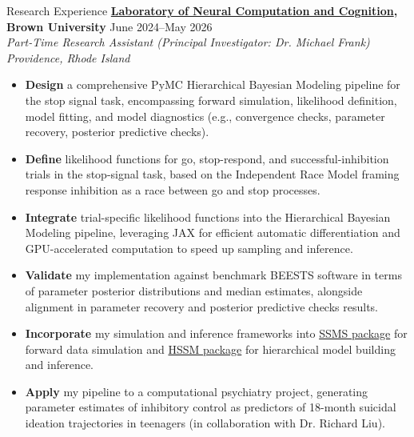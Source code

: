 \documentclass{resume} %
\begin{document}
\begin{rSection}{Research Experience}
\textbf{\href{https://www.lnccbrown.com/}{Laboratory of Neural Computation and Cognition}, Brown University} \hfill{June 2024--May 2026} \\
\textit{Part-Time Research Assistant (Principal Investigator: Dr. Michael Frank)} \hfill{\textit{Providence, Rhode Island}}
\begin{itemize}
\itemsep -5pt {} 
 \item \textbf{Design} a comprehensive PyMC Hierarchical Bayesian Modeling pipeline for the stop signal task, encompassing forward simulation, likelihood definition, model fitting, and model diagnostics (e.g., convergence checks, parameter recovery, posterior predictive checks).
 \item \textbf{Define} likelihood functions for go, stop-respond, and successful-inhibition trials in the stop-signal task, based on the Independent Race Model framing response inhibition as a race between go and stop processes. 
 \item \textbf{Integrate} trial-specific likelihood functions into the Hierarchical Bayesian Modeling pipeline, leveraging JAX for efficient automatic differentiation and GPU-accelerated computation to speed up sampling and inference.
 \item \textbf{Validate} my implementation against benchmark BEESTS software in terms of    parameter posterior distributions and median estimates, alongside alignment in parameter recovery and posterior predictive checks results.
 \item \textbf{Incorporate} my simulation and inference frameworks into \href{https://lnccbrown.github.io/ssm-simulators/}{SSMS package} for forward data simulation and \href{https://lnccbrown.github.io/HSSM/}{HSSM package} for hierarchical model building and inference.  
 \item \textbf{Apply} my pipeline to a computational psychiatry project, generating parameter estimates of inhibitory control as predictors of 18-month suicidal ideation trajectories in teenagers (in collaboration with Dr. Richard Liu).
\end{itemize}


\end{rSection}
\end{document}
